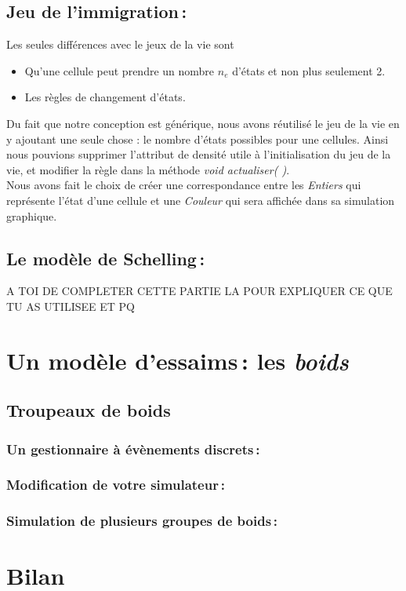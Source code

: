 \documentclass[a4paper, 10pt, french]{article}
\begin{document}
\subsection{Jeu de l'immigration\,:}
	{
Les seules différences avec le jeux de la vie sont 
	\begin{itemize}
		\item Qu'une cellule peut prendre un nombre {\em $n_e$} d'états et non plus seulement 2.
		\item Les règles de changement d'états.
	\end{itemize}
\indent Du fait que notre conception est générique, nous avons réutilisé le jeu de la vie en y ajoutant une seule chose : le nombre d'états possibles pour une cellules. Ainsi nous pouvions supprimer l'attribut de densité utile à l'initialisation du jeu de la vie, et modifier la règle dans la méthode {\em void actualiser( )}. 
\\ \indent Nous avons fait le choix de créer une correspondance entre les {\em Entiers} qui représente l'état d'une cellule et une {\em Couleur} qui sera affichée dans sa simulation graphique.
	}
\subsection{Le modèle de Schelling\,:}
 	{ 
	A TOI DE COMPLETER CETTE PARTIE LA POUR EXPLIQUER CE QUE TU AS UTILISEE ET PQ 
	} 

\section{Un modèle d'essaims\,: les {\em boids}}
  \subsection{Troupeaux de boids}
  {
  
  }
    \subsubsection{Un gestionnaire à évènements discrets\,:} 
      {
      
      } 
    \subsubsection{Modification de votre simulateur\,: } 
      {
       
      }
      \subsubsection{Simulation de plusieurs groupes de boids\,: } 
      {
      
      }

\section{Bilan}
{

}
\end{document}
